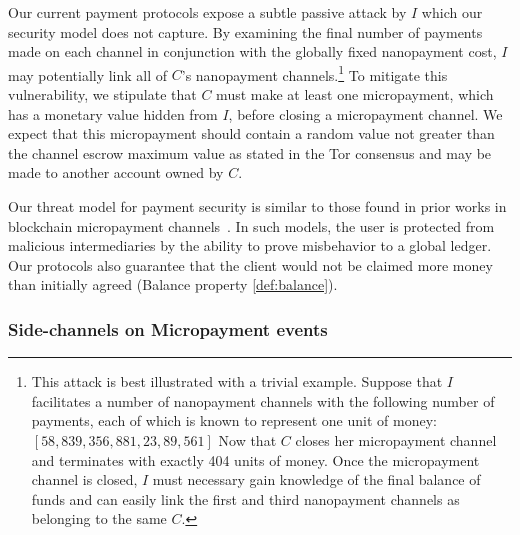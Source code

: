 Our current payment protocols expose a subtle passive attack by $I$ which our
security model does not capture. By examining the final number of payments made
on each channel in conjunction with the globally fixed nanopayment cost, $I$ may
potentially link all of $C$'s nanopayment channels.\footnote{This attack is best
  illustrated with a trivial example. Suppose that $I$ facilitates a number of
  nanopayment channels with the following number of payments, each of which is
  known to represent one unit of money: $[58, 839, 356, 881, 23, 89, 561]$ Now
  that $C$ closes her micropayment channel and terminates with exactly 404 units
  of money. Once the micropayment channel is closed, $I$ must necessary gain
  knowledge of the final balance of funds and can easily link the first and
  third nanopayment channels as belonging to the same $C$.} To mitigate this
vulnerability, we stipulate that $C$ must make at least one micropayment, which
has a monetary value hidden from $I$, before closing a micropayment channel. We
expect that this micropayment should contain a random value not greater than the
channel escrow maximum value as stated in the Tor consensus and may be made to
another account owned by $C$.

Our threat model for payment security is similar to those found in prior works
in blockchain micropayment channels~\cite{poon2016bitcoin}. In such models, the
user is protected from malicious intermediaries by the ability to prove
misbehavior to a global ledger. Our protocols also guarantee that the client
would not be claimed more money than initially agreed (Balance property
\ref{def:balance}).

\subsubsection{Side-channels on Micropayment events}

